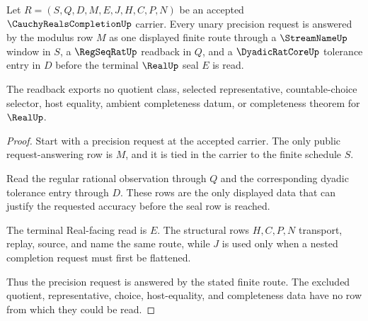\begin{theorem}
\label{thm:cauchy-reals-completion-modulus-readback}
Let $R=(S,Q,D,M,E,J,H,C,P,N)$ be an accepted $\CauchyRealsCompletionUp$ carrier. Every unary precision request is answered by the modulus row $M$ as one displayed finite route through a $\StreamNameUp$ window in $S$, a $\RegSeqRatUp$ readback in $Q$, and a $\DyadicRatCoreUp$ tolerance entry in $D$ before the terminal $\RealUp$ seal $E$ is read.

The readback exports no quotient class, selected representative, countable-choice selector, host equality, ambient completeness datum, or completeness theorem for $\RealUp$.
\end{theorem}
\begin{proof}
Start with a precision request at the accepted carrier. The only public request-answering row is $M$, and it is tied in the carrier to the finite schedule $S$.

Read the regular rational observation through $Q$ and the corresponding dyadic tolerance entry through $D$. These rows are the only displayed data that can justify the requested accuracy before the seal row is reached.

The terminal Real-facing read is $E$. The structural rows $H,C,P,N$ transport, replay, source, and name the same route, while $J$ is used only when a nested completion request must first be flattened.

Thus the precision request is answered by the stated finite route. The excluded quotient, representative, choice, host-equality, and completeness data have no row from which they could be read.
\end{proof}

